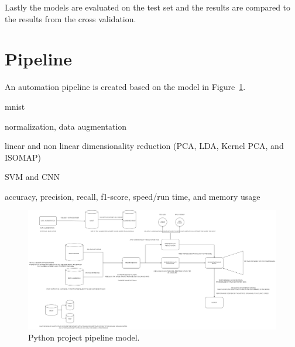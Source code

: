 Lastly the models are evaluated on the test set and the results are compared to the results from the cross validation.

\section{Pipeline}\label{sec:pipeline}

An automation pipeline is created based on the model in Figure~\ref{fig:python-pipeline-model}.


\begin{description}
    \setlength\itemsep{0em}
    \item[dataset] mnist
    \item[pre-preprocessing] normalization, data augmentation
    \item[preprocessing] linear and non linear dimensionality reduction (PCA, LDA, Kernel PCA, and ISOMAP)
    \item[models] SVM and CNN
    \item[evaluation] accuracy, precision, recall, f1-score, speed/run time, and memory usage
\end{description}


\begin{figure}[htb!]
    \centering
    \includegraphics[width=\textwidth]{figures/pipeline-draft.png}
    \caption{Python project pipeline model.}
    \label{fig:python-pipeline-model}
\end{figure}


